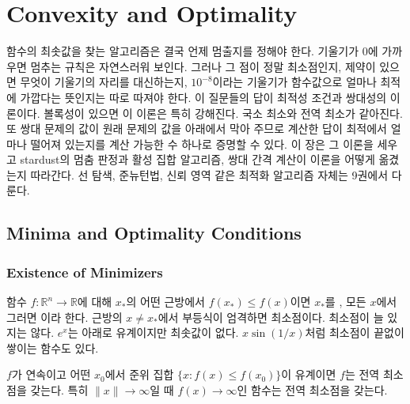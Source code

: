 \chapter{Convexity and Optimality}
\label{ch:convexity}


함수의 최솟값을 찾는 알고리즘은 결국 언제 멈출지를 정해야 한다. 기울기가 $0$에 가까우면 멈추는 규칙은 자연스러워 보인다. 그러나 그 점이 정말 최소점인지, 제약이 있으면 무엇이 기울기의 자리를 대신하는지, $10^{-8}$이라는 기울기가 함수값으로 얼마나 최적에 가깝다는 뜻인지는 따로 따져야 한다. 이 질문들의 답이 최적성 조건과 쌍대성의 이론이다. 볼록성이 있으면 이 이론은 특히 강해진다. 국소 최소와 전역 최소가 같아진다. 또 쌍대 문제의 값이 원래 문제의 값을 아래에서 막아 주므로 계산한 답이 최적에서 얼마나 떨어져 있는지를 계산 가능한 수 하나로 증명할 수 있다. 이 장은 그 이론을 세우고 stardust의 멈춤 판정과 활성 집합 알고리즘, 쌍대 간격 계산이 이론을 어떻게 옮겼는지 따라간다. 선 탐색, 준뉴턴법, 신뢰 영역 같은 최적화 알고리즘 자체는 9권에서 다룬다.

\section{Minima and Optimality Conditions}
\label{sec:optimality}

\subsection{Existence of Minimizers}

함수 $f:\mathbb R^n\to\mathbb R$에 대해 $x_\ast$의 어떤 근방에서 $f(x_\ast)\le f(x)$이면 $x_\ast$를 , 모든 $x$에서 그러면 이라 한다. 근방의 $x\ne x_\ast$에서 부등식이 엄격하면  최소점이다. 최소점이 늘 있지는 않다. $e^x$는 아래로 유계이지만 최솟값이 없다. $x\sin(1/x)$처럼 최소점이 끝없이 쌓이는 함수도 있다.

\begin{proposition}
\label{prop:existence}
$f$가 연속이고 어떤 $x_0$에서 준위 집합 $\{x:f(x)\le f(x_0)\}$이 유계이면 $f$는 전역 최소점을 갖는다. 특히 $\|x\|\to\infty$일 때 $f(x)\to\infty$인  함수는 전역 최소점을 갖는다.
\end{proposition}

